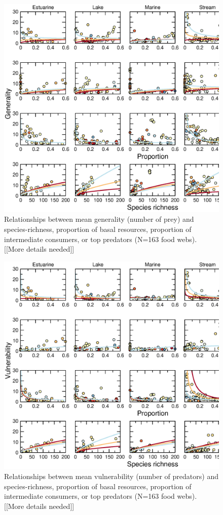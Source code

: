 \documentclass[12pt]{article}
\begin{document}
\begin{figure}[!h]
\label{Gen}
\includegraphics[width=.9\textwidth]{Figures/by_TL/scaling_with_S/proportions/Gen_nonts.eps}
\caption{Relationships between mean generality (number of prey) and species-richness, proportion of basal resources, proportion of intermediate consumers, or top predators (N=163 food webs). [[More details needed]]}
\end{figure}


\begin{figure}[!h]
\label{Vul}
\includegraphics[width=.9\textwidth]{Figures/by_TL/scaling_with_S/proportions/Vul_nonts.eps}
\caption{Relationships between mean vulnerability (number of predators) and species-richness, proportion of basal resources, proportion of intermediate consumers, or top predators (N=163 food webs). [[More details needed]]}
\end{figure}
\end{document}
